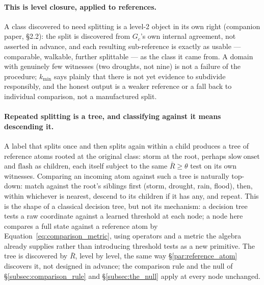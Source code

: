 \documentclass[12pt, a4paper]{article}
\begin{document}
\paragraph{This is level closure, applied to references.} A class
discovered to need splitting is a level-2 object in its own right
(companion paper, \S2.2): the split is discovered from $G_c$'s own
internal agreement, not asserted in advance, and each resulting
sub-reference is exactly as usable --- comparable, walkable, further
splittable --- as the class it came from. A domain with genuinely
few witnesses (two droughts, not nine) is not a failure of the
procedure; $k_{\min}$ says plainly that there is not yet evidence to
subdivide responsibly, and the honest output is a weaker reference or
a fall back to individual comparison, not a manufactured split.

\paragraph{Repeated splitting is a tree, and classifying against it
means descending it.} A label that splits once and then splits again
within a child produces a tree of reference atoms rooted at the
original class: $\mathrm{storm}$ at the root, perhaps $\mathrm{slow\
onset}$ and $\mathrm{flash}$ as children, each itself subject to the
same $\bar R\ge\theta$ test on its own witnesses. Comparing an
incoming atom against such a tree is naturally top-down: match against
the root's siblings first (storm, drought, rain, flood), then, within
whichever is nearest, descend to its children if it has any, and
repeat. This is the shape of a classical decision tree, but not its
mechanism: a decision tree tests a raw coordinate against a learned
threshold at each node; a node here compares a full state against a
reference atom by Equation~\eqref{eq:comparison_metric}, using
operators and a metric the algebra already supplies rather than
introducing threshold tests as a new primitive. The tree is discovered
by $\bar R$, level by level, the same way \S\ref{par:reference_atom}
discovers it, not designed in advance; the comparison rule and the
null of \S\ref{subsec:comparison_rule} and \S\ref{subsec:the_null}
apply at every node unchanged.
\end{document}
